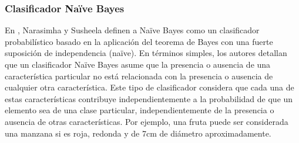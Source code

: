 \subsubsection{Clasificador Na\"{i}ve Bayes}

	En \cite{NarasMurty}, Narasimha y Susheela definen a Na\"{i}ve Bayes como un clasificador probabilístico basado en la aplicación del teorema de Bayes con una fuerte suposición de independencia (na\"{i}ve). En términos simples, los autores detallan que un clasificador Na\"{i}ve Bayes asume que la presencia o ausencia de una característica particular no está relacionada con la presencia o ausencia de cualquier otra característica. Este tipo de clasificador considera que cada una de estas características contribuye independientemente a la probabilidad de que un elemento sea de una clase particular, independientemente de la presencia o ausencia de otras características. Por ejemplo, una fruta puede ser considerada una manzana si es roja, redonda y de 7cm de diámetro aproximadamente.

